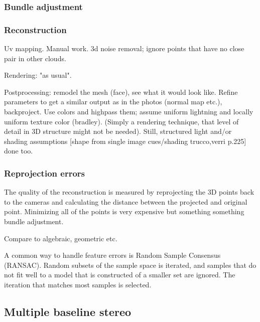 \subsubsection{Bundle adjustment}

\subsubsection{Reconstruction}

Uv mapping. Manual work. 3d noise removal; ignore points that have no close pair in other clouds.

Rendering: "as usual".

Postprocessing: remodel the mesh (face), see what it would look like. Refine parameters to get a similar output as in the photos (normal map etc.), backproject. Use colors and highpass them; assume uniform lightning and locally uniform texture color (bradley). (Simply a rendering technique, that level of detail in 3D structure might not be needed). Still, structured light and/or shading assumptions [shape from single image cues/shading trucco,verri p.225] done too.


\subsubsection{Reprojection errors}

The quality of the reconstruction is measured by reprojecting the 3D points back to the cameras and calculating the distance between the projected and original point.
Minimizing all of the points is very expensive but something something bundle adjustment.

Compare to algebraic, geometric etc.

A common way to handle feature errors is Random Sample Consensus (RANSAC). Random subsets of the sample space is iterated, and samples that do not fit well to a model that is constructed of a smaller set are ignored. The iteration that matches most samples is selected.


\subsection{Multiple baseline stereo}
